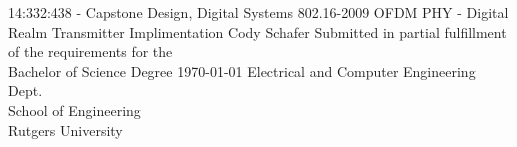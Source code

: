
\begin{titlepage}
\begin{center}
	{14:332:438 - Capstone Design, Digital Systems}
	{802.16-2009 OFDM PHY - Digital Realm Transmitter Implimentation}
	{Cody Schafer}
	{
		Submitted in partial fulfillment of the requirements for the \\
		Bachelor of Science Degree
	}
	{\today}
	{
		Electrical and Computer Engineering Dept. \\
		School of Engineering \\
		Rutgers University
	}
\end{center}
\end{titlepage}
